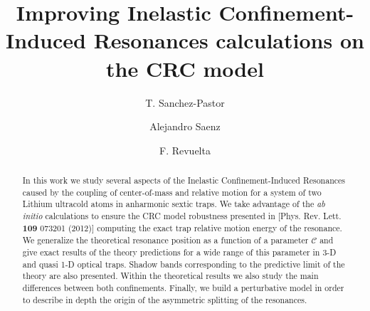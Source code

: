 \documentclass[aps,pre,twocolumn,superscriptaddress,showpacs]{revtex4-1}
\newcommand{\abinitio}{\textit{ab initio }}
\begin{document}
\title{Improving Inelastic Confinement-Induced Resonances calculations on the CRC model}
%
\author{T. Sanchez-Pastor}

\author{Alejandro Saenz}

\author{F. Revuelta}
%
\begin{abstract}
In this work we study several aspects of the Inelastic Confinement-Induced Resonances caused by the coupling of center-of-mass and relative motion for a system of two Lithium ultracold atoms in anharmonic sextic traps. We take advantage of the \abinitio calculations to ensure the CRC model robustness presented in [Phys. Rev. Lett. \textbf{109} 073201 (2012)] computing the exact trap relative motion energy of the resonance. We generalize the theoretical resonance position as a function of a parameter $\mathcal{C}$ and give exact results of the theory predictions for a wide range of this parameter in 3-D and quasi 1-D optical traps. Shadow bands corresponding to the predictive limit of the theory are also presented. Within the theoretical results we also study the main differences between both confinements. Finally, we build a perturbative model in order to describe in depth the origin of the asymmetric splitting of the resonances.
\end{abstract}

\maketitle

\end{document}
